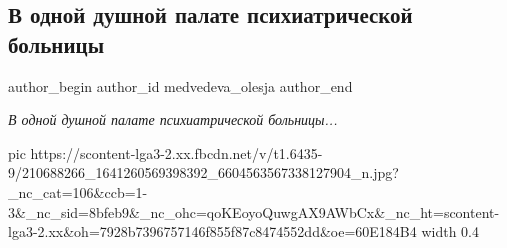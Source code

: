  
 
 
 
 
 
\subsection{В одной душной палате психиатрической больницы}
\label{sec:30_06_2021.fb.medvedeva_olesja.1.psih_bolnica_pobeda_futbol_ukraina}
\ifcmt
 author_begin
   author_id medvedeva_olesja
 author_end
\fi

\begin{center}
\color{blue}
\Large\em
В одной душной палате психиатрической больницы...
\end{center}

\ifcmt
  pic https://scontent-lga3-2.xx.fbcdn.net/v/t1.6435-9/210688266_1641260569398392_6604563567338127904_n.jpg?_nc_cat=106&ccb=1-3&_nc_sid=8bfeb9&_nc_ohc=qoKEoyoQuwgAX9AWbCx&_nc_ht=scontent-lga3-2.xx&oh=7928b7396757146f855f87c8474552dd&oe=60E184B4
  width 0.4
\fi

